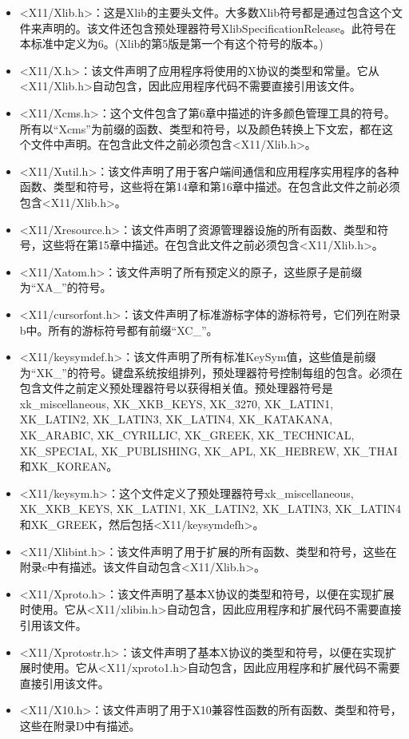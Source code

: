 \begin{itemize}
	\item <X11/Xlib.h>：这是Xlib的主要头文件。大多数Xlib符号都是通过包含这个文件来声明的。该文件还包含预处理器符号XlibSpecificationRelease。此符号在本标准中定义为6。(Xlib的第5版是第一个有这个符号的版本。)
	\item <X11/X.h>：该文件声明了应用程序将使用的X协议的类型和常量。它从<X11/Xlib.h>自动包含，因此应用程序代码不需要直接引用该文件。
	\item <X11/Xcms.h>：这个文件包含了第6章中描述的许多颜色管理工具的符号。所有以“Xcms”为前缀的函数、类型和符号，以及颜色转换上下文宏，都在这个文件中声明。在包含此文件之前必须包含<X11/Xlib.h>。
	\item <X11/Xutil.h>：该文件声明了用于客户端间通信和应用程序实用程序的各种函数、类型和符号，这些将在第14章和第16章中描述。在包含此文件之前必须包含<X11/Xlib.h>。
	\item <X11/Xresource.h>：该文件声明了资源管理器设施的所有函数、类型和符号，这些将在第15章中描述。在包含此文件之前必须包含<X11/Xlib.h>。
	\item <X11/Xatom.h>：该文件声明了所有预定义的原子，这些原子是前缀为“XA\_”的符号。
	\item <X11/cursorfont.h>：该文件声明了标准游标字体的游标符号，它们列在附录b中。所有的游标符号都有前缀“XC\_”。
	\item <X11/keysymdef.h>：该文件声明了所有标准KeySym值，这些值是前缀为“XK\_”的符号。键盘系统按组排列，预处理器符号控制每组的包含。必须在包含文件之前定义预处理器符号以获得相关值。预处理器符号是xk\_miscellaneous, XK\_XKB\_KEYS, XK\_3270, XK\_LATIN1, XK\_LATIN2, XK\_LATIN3, XK\_LATIN4, XK\_KATAKANA, XK\_ARABIC, XK\_CYRILLIC, XK\_GREEK, XK\_TECHNICAL, XK\_SPECIAL, XK\_PUBLISHING, XK\_APL, XK\_HEBREW, XK\_THAI和XK\_KOREAN。
	\item <X11/keysym.h>：这个文件定义了预处理器符号xk\_miscellaneous, XK\_XKB\_KEYS, XK\_LATIN1, XK\_LATIN2, XK\_LATIN3, XK\_LATIN4和XK\_GREEK，然后包括<X11/keysymdefh>。
	\item <X11/Xlibint.h>：该文件声明了用于扩展的所有函数、类型和符号，这些在附录c中有描述。该文件自动包含<X11/Xlib.h>。
	\item <X11/Xproto.h>：该文件声明了基本X协议的类型和符号，以便在实现扩展时使用。它从<X11/xlibin.h>自动包含，因此应用程序和扩展代码不需要直接引用该文件。
	\item <X11/Xprotostr.h>：该文件声明了基本X协议的类型和符号，以便在实现扩展时使用。它从<X11/xproto1.h>自动包含，因此应用程序和扩展代码不需要直接引用该文件。
	\item <X11/X10.h>：该文件声明了用于X10兼容性函数的所有函数、类型和符号，这些在附录D中有描述。
\end{itemize}

